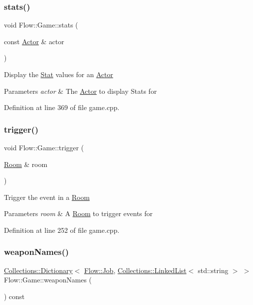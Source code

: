 \subsubsection{\texorpdfstring{stats()}{stats()}}
{\footnotesize\ttfamily void Flow\+::\+Game\+::stats (\begin{DoxyParamCaption}\item[{const \hyperlink{class_flow_1_1_actor}{Actor} \&}]{actor }\end{DoxyParamCaption})}

Display the \hyperlink{class_flow_1_1_stat}{Stat} values for an \hyperlink{class_flow_1_1_actor}{Actor} 
\begin{DoxyParams}{Parameters}
{\em actor} & The \hyperlink{class_flow_1_1_actor}{Actor} to display Stats for \\
\hline
\end{DoxyParams}


Definition at line 369 of file game.\+cpp.

\hypertarget{class_flow_1_1_game_aa4e29ff35123debac161f187f97aaf7d}{}\label{class_flow_1_1_game_aa4e29ff35123debac161f187f97aaf7d} 
\subsubsection{\texorpdfstring{trigger()}{trigger()}}
{\footnotesize\ttfamily void Flow\+::\+Game\+::trigger (\begin{DoxyParamCaption}\item[{\hyperlink{class_flow_1_1_room}{Room} \&}]{room }\end{DoxyParamCaption})}

Trigger the event in a \hyperlink{class_flow_1_1_room}{Room} 
\begin{DoxyParams}{Parameters}
{\em room} & A \hyperlink{class_flow_1_1_room}{Room} to trigger events for \\
\hline
\end{DoxyParams}


Definition at line 252 of file game.\+cpp.

\hypertarget{class_flow_1_1_game_abbcc4db0f8c813849e1d110871a5bf66}{}\label{class_flow_1_1_game_abbcc4db0f8c813849e1d110871a5bf66} 
\subsubsection{\texorpdfstring{weapon\+Names()}{weaponNames()}}
{\footnotesize\ttfamily \hyperlink{class_collections_1_1_dictionary}{Collections\+::\+Dictionary}$<$ \hyperlink{namespace_flow_a05bb774db920847e46f3779aaef1b07b}{Flow\+::\+Job}, \hyperlink{class_collections_1_1_linked_list}{Collections\+::\+Linked\+List}$<$ std\+::string $>$ $>$ Flow\+::\+Game\+::weapon\+Names (\begin{DoxyParamCaption}{ }\end{DoxyParamCaption}) const}

